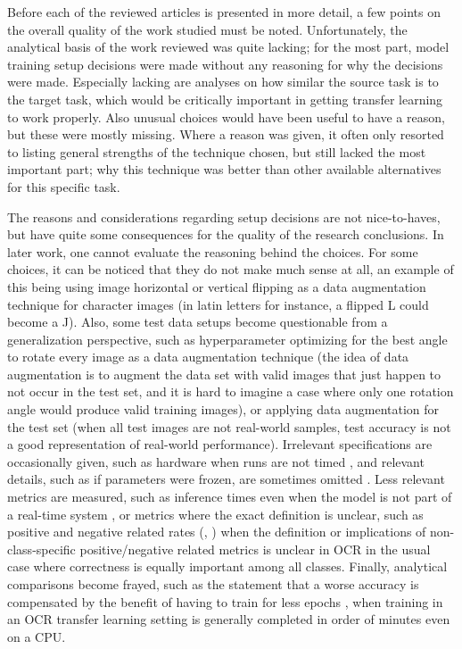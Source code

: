 \documentclass{article}
\begin{document}

Before each of the reviewed articles is presented in more detail, a few points on the overall quality of the work studied must be noted.
 Unfortunately, the analytical basis of the work reviewed was quite lacking; for the most part, model training setup decisions were made 
 without any reasoning for why the decisions were made. Especially lacking are analyses on how similar the source task 
 is to the target task, which would be critically important in getting transfer learning to work properly. 
 Also unusual choices would have been useful to have a reason, but these were mostly missing. 
 Where a reason was given, it often only resorted to listing general strengths of the technique chosen,
  but still lacked the most important part; why this technique was better than other available alternatives for this specific task.

The reasons and considerations regarding setup decisions are not nice-to-haves, 
but have quite some consequences for the quality of the research conclusions. In later work, one cannot evaluate
 the reasoning behind the choices. For some choices, it can be noticed that they do not make much sense at all, an example of this being 
 using image horizontal or vertical flipping as a data augmentation technique for character images \cite{9thuonPalm}
 (in latin letters for instance, a flipped L could become a J). Also, some test data setups become questionable from a 
 generalization perspective, such as hyperparameter optimizing for the best angle to rotate every image 
 as a data augmentation technique \cite{7rizkybasicCnnTransfer} (the idea of data augmentation is to augment
  the data set with valid images that just happen to not occur in the test set, 
  and it is hard to imagine a case where only one rotation angle would produce valid training images), 
  or applying data augmentation for the test set \cite{11zunairUnconventionalWisdom} (when all test images are not real-world samples, 
  test accuracy is not a good representation of real-world performance). 
  Irrelevant specifications are occasionally given, such as hardware when runs are not timed \cite{9thuonPalm}, and relevant details, 
  such as if parameters were frozen, are sometimes omitted \cite{8goelGujarati2023}.
  Less relevant metrics are measured, such as inference times even when the model is not part of a real-time system \cite{8goelGujarati2023},
  or metrics where the exact definition is unclear, such as positive and negative related rates (\cite{10goelGujarati}, \cite{5rasheedHandwrittenUrduWAlexNet}) when the definition or implications
  of non-class-specific positive/negative related metrics is unclear in OCR in the usual case where correctness is equally important
  among all classes. Finally, analytical comparisons become frayed, such as the statement that a worse accuracy is compensated by the
   benefit of having to train for less epochs \cite{3chatterjeeBengali}, when training in an OCR transfer learning setting is generally completed in order of minutes even on a CPU.
\end{document}
